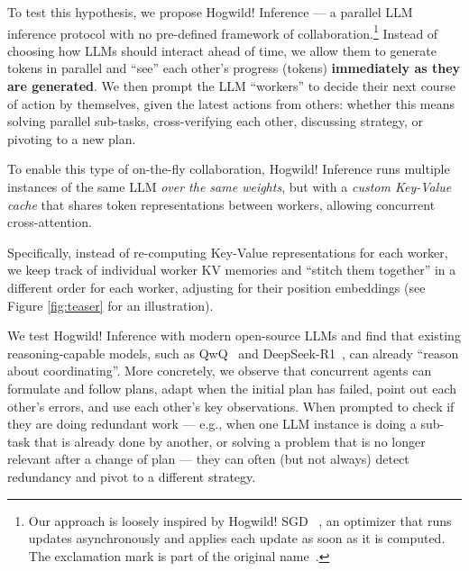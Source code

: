 
To test this hypothesis, we propose Hogwild! Inference --- a parallel LLM inference protocol with no pre-defined framework of collaboration.\footnote[2]{Our approach is loosely inspired by Hogwild! SGD ~\cite{NIPS2011_218a0aef}, an optimizer that runs updates asynchronously and applies each update as soon as it is computed. The exclamation mark is part of the original name~\citep{hogwild_exclamation_mark}.}
Instead of choosing how LLMs should interact ahead of time, we allow them to generate tokens in parallel and ``see'' each other's progress (tokens) \textbf{immediately as they are generated}.
We then prompt the LLM ``workers'' to decide their next course of action by themselves, given the latest actions from others: whether this means solving parallel sub-tasks, cross-verifying each other, discussing strategy, or pivoting to a new plan.

To enable this type of on-the-fly collaboration, Hogwild! Inference runs multiple instances of the same LLM \emph{over the same weights}, but with a \emph{custom Key-Value cache} that shares token representations between workers, allowing concurrent cross-attention. 

Specifically, instead of re-computing Key-Value representations for each worker, we keep track of individual worker KV memories and ``stitch them together'' in a different order for each worker, adjusting for their position embeddings (see Figure \ref{fig:teaser} for an illustration).

We test Hogwild!\! Inference with modern open-source LLMs and find that existing reasoning-capable models, such as QwQ~\citep{qwq32b} and DeepSeek-R1~\citep{deepseek_r1}, can already ``reason about coordinating''. More concretely, we observe that concurrent agents can formulate and follow plans, adapt when the initial plan has failed, point out each other's errors, and use each other's key observations. When prompted to check if they are doing redundant work --- e.g., when one LLM instance is doing a sub-task that is already done by another, or solving a problem that is no longer relevant after a change of plan --- they can often (but not always) detect redundancy and pivot to a different strategy.

